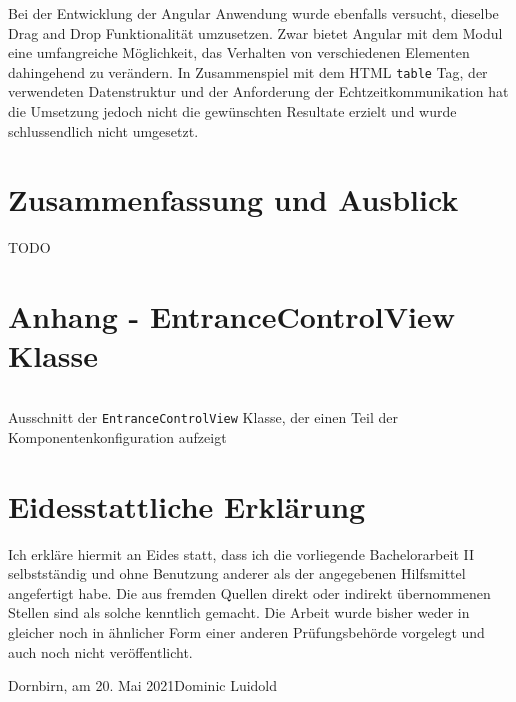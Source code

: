 \documentclass[a4paper,12pt,twoside]{scrreprt}
\begin{document}
\medskip

Bei der Entwicklung der Angular Anwendung wurde ebenfalls versucht, dieselbe Drag and Drop Funktionalität umzusetzen. Zwar bietet Angular mit dem  Modul eine umfangreiche Möglichkeit, das Verhalten von verschiedenen Elementen dahingehend zu verändern. In Zusammenspiel mit dem HTML \texttt{table} Tag, der verwendeten Datenstruktur und der Anforderung der Echtzeitkommunikation hat die Umsetzung jedoch nicht die gewünschten Resultate erzielt und wurde schlussendlich nicht umgesetzt.

\chapter{Zusammenfassung und Ausblick}
\label{chap:zusammenfassung-ausblick}
TODO

\clearpage
{}
{}
\printbibliography

\appendix

\chapter*{Anhang - EntranceControlView Klasse}
\label{appendix:entrance-control-view-class}
\begin{listing}[H]
    \inputminted[fontsize=\footnotesize,linenos,breaklines]{java}{code/Luidold_Results-Vaadin-Components-CodeSample.java}
    \caption[Ausschnitt der \texttt{EntranceControlView} Klasse, der einen Teil der Komponentenkonfiguration aufzeigt]{Ausschnitt der \texttt{EntranceControlView} Klasse, der einen Teil der Komponentenkonfiguration aufzeigt}
    \label{code:results-vaadin-components}
\end{listing}

\chapter*{Eidesstattliche Erklärung}
Ich erkläre hiermit an Eides statt, dass ich die vorliegende Bachelorarbeit II selbstständig und ohne Benutzung anderer als der angegebenen Hilfsmittel angefertigt habe. Die aus fremden Quellen direkt oder indirekt übernommenen Stellen sind als solche kenntlich gemacht. Die Arbeit wurde bisher weder in gleicher noch in ähnlicher Form einer anderen Prüfungsbehörde vorgelegt und auch noch nicht veröffentlicht.

\vspace{5cm}
\noindent
Dornbirn, am 20. Mai 2021\hfill Dominic Luidold
\end{document}
